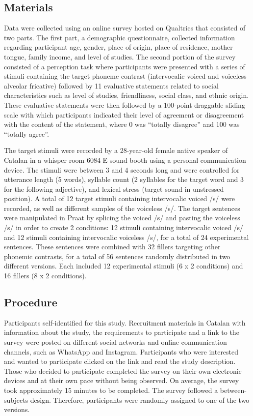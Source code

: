 \documentclass[
  a4paper,
  11pt,
  twocolumn]{article}
\begin{document}
\subsection{Materials}

Data were collected using an online survey hosted on Qualtrics that
consisted of two parts. The first part, a demographic questionnaire,
collected information regarding participant age, gender, place of
origin, place of residence, mother tongue, family income, and level of
studies. The second portion of the survey consisted of a perception task
where participants were presented with a series of stimuli containing
the target phoneme contrast (intervocalic voiced and voiceless alveolar
fricative) followed by 11 evaluative statements related to social
characteristics such as level of studies, friendliness, social class,
and ethnic origin. These evaluative statements were then followed by a
100-point draggable sliding scale with which participants indicated
their level of agreement or disagreement with the content of the
statement, where 0 was ``totally disagree'' and 100 was ``totally
agree''.

The target stimuli were recorded by a 28-year-old female native speaker
of Catalan in a whisper room 6084 E sound booth using a personal
communication device. The stimuli were between 3 and 4 seconds long and
were controlled for utterance length (5 words), syllable count (2
syllables for the target word and 3 for the following adjective), and
lexical stress (target sound in unstressed position). A total of 12
target stimuli containing intervocalic voiced /s/ were recorded, as well
as different samples of the voiceless /s/. The target sentences were
manipulated in Praat by splicing the voiced /s/ and pasting the
voiceless /s/ in order to create 2 conditions: 12 stimuli containing
intervocalic voiced /s/ and 12 stimuli containing intervocalic voiceless
/s/, for a total of 24 experimental sentences. These sentences were
combined with 32 fillers targeting other phonemic contrasts, for a total
of 56 sentences randomly distributed in two different versions. Each
included 12 experimental stimuli (6 x 2 conditions) and 16 fillers (8 x
2 conditions).

\subsection{Procedure}

Participants self-identified for this study. Recruitment materials in
Catalan with information about the study, the requirements to
participate and a link to the survey were posted on different social
networks and online communication channels, such as WhatsApp and
Instagram. Participants who were interested and wanted to participate
clicked on the link and read the study description. Those who decided to
participate completed the survey on their own electronic devices and at
their own pace without being observed. On average, the survey took
approximately 15 minutes to be completed. The survey followed a
between-subjects design. Therefore, participants were randomly assigned
to one of the two versions.
\end{document}
